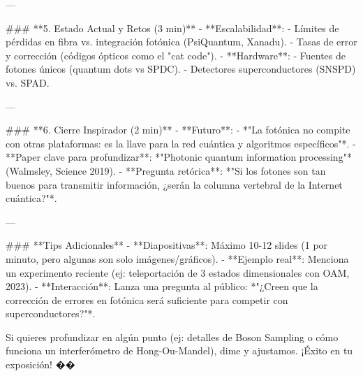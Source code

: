---

### **5. Estado Actual y Retos (3 min)**
- **Escalabilidad**:  
  - Límites de pérdidas en fibra vs. integración fotónica (PsiQuantum, Xanadu).  
  - Tasas de error y corrección (códigos ópticos como el "cat code").  
- **Hardware**:  
  - Fuentes de fotones únicos (quantum dots vs SPDC).  
  - Detectores superconductores (SNSPD) vs. SPAD.  

---

### **6. Cierre Inspirador (2 min)**
- **Futuro**:  
  - *"La fotónica no compite con otras plataformas: es la llave para la red cuántica y algoritmos específicos"*.  
  - **Paper clave para profundizar**: *"Photonic quantum information processing"* (Walmsley, Science 2019).  
- **Pregunta retórica**: *"Si los fotones son tan buenos para transmitir información, ¿serán la columna vertebral de la Internet cuántica?"*.  

---

### **Tips Adicionales**  
- **Diapositivas**: Máximo 10-12 slides (1 por minuto, pero algunas son solo imágenes/gráficos).  
- **Ejemplo real**: Menciona un experimento reciente (ej: teleportación de 3 estados dimensionales con OAM, 2023).  
- **Interacción**: Lanza una pregunta al público: *"¿Creen que la corrección de errores en fotónica será suficiente para competir con superconductores?"*.  

Si quieres profundizar en algún punto (ej: detalles de Boson Sampling o cómo funciona un interferómetro de Hong-Ou-Mandel), dime y ajustamos. ¡Éxito en tu exposición! ��